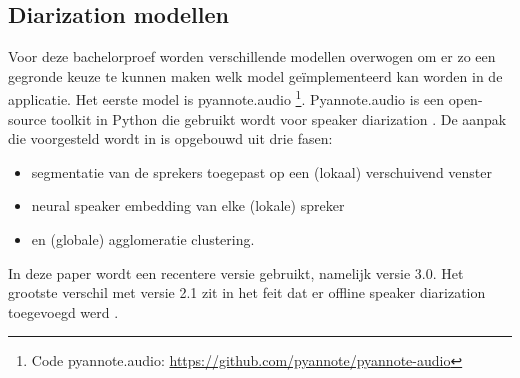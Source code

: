 \subsection{Diarization modellen}
Voor deze bachelorproef worden verschillende modellen overwogen om er zo een gegronde keuze te kunnen maken welk model geïmplementeerd kan worden in de applicatie. Het eerste model is pyannote.audio \footnote{Code pyannote.audio: \url{https://github.com/pyannote/pyannote-audio}}. Pyannote.audio is een open-source toolkit in Python die gebruikt wordt voor speaker diarization \autocite{Bredin2023}. De aanpak die voorgesteld wordt in \textcite{Bredin2023} is opgebouwd uit drie fasen:
\begin{itemize}
	\item segmentatie van de sprekers toegepast op een (lokaal) verschuivend venster
	\item neural speaker embedding van elke (lokale) spreker
	\item en (globale) agglomeratie clustering.
\end{itemize}
In deze paper wordt een recentere versie gebruikt, namelijk versie 3.0. Het grootste verschil met versie 2.1 zit in het feit dat er offline speaker diarization toegevoegd werd \textcite{Bredin2024}.

